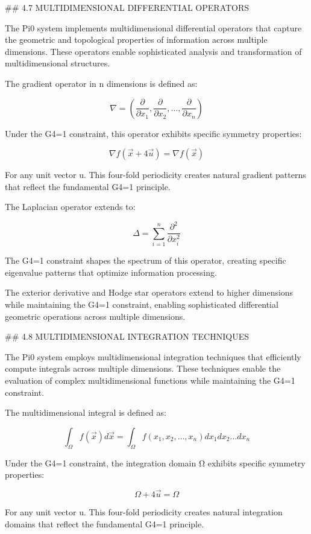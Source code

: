 ## 4.7 MULTIDIMENSIONAL DIFFERENTIAL OPERATORS

The Pi0 system implements multidimensional differential operators that capture the geometric and topological properties of information across multiple dimensions. These operators enable sophisticated analysis and transformation of multidimensional structures.

The gradient operator in n dimensions is defined as:

$$\nabla = \left(\frac{\partial}{\partial x_1}, \frac{\partial}{\partial x_2}, \ldots, \frac{\partial}{\partial x_n}\right)$$

Under the G4=1 constraint, this operator exhibits specific symmetry properties:

$$\nabla f(\vec{x}+4\vec{u}) = \nabla f(\vec{x})$$

For any unit vector u⃗. This four-fold periodicity creates natural gradient patterns that reflect the fundamental G4=1 principle.

The Laplacian operator extends to:

$$\Delta = \sum_{i=1}^n \frac{\partial^2}{\partial x_i^2}$$

The G4=1 constraint shapes the spectrum of this operator, creating specific eigenvalue patterns that optimize information processing.

The exterior derivative and Hodge star operators extend to higher dimensions while maintaining the G4=1 constraint, enabling sophisticated differential geometric operations across multiple dimensions.

## 4.8 MULTIDIMENSIONAL INTEGRATION TECHNIQUES

The Pi0 system employs multidimensional integration techniques that efficiently compute integrals across multiple dimensions. These techniques enable the evaluation of complex multidimensional functions while maintaining the G4=1 constraint.

The multidimensional integral is defined as:

$$\int_{\Omega} f(\vec{x}) d\vec{x} = \int_{\Omega} f(x_1, x_2, \ldots, x_n) dx_1 dx_2 \ldots dx_n$$

Under the G4=1 constraint, the integration domain Ω exhibits specific symmetry properties:

$$\Omega + 4\vec{u} = \Omega$$

For any unit vector u⃗. This four-fold periodicity creates natural integration domains that reflect the fundamental G4=1 principle.

